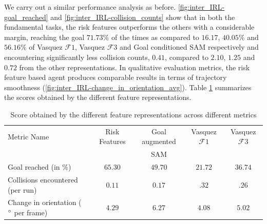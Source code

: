 
We carry out a similar performance analysis as before. \autoref{fig:inter_IRL-goal_reached} and \autoref{fig:inter_IRL-collision_counts} show that in both the fundamental tasks, the risk features outperforms the others with a considerable margin, reaching the goal $71.73\%$ of the times as compared to $16.17$, $40.05\%$ and $56.16\%$ of Vasquez $\mathcal{F}1$, Vasquez $\mathcal{F}3$ and Goal conditioned SAM respectively and encountering significantly less collision counts, $0.41$, compared to $2.10$, $1.25$ and $0.72$ from the other  representations. In qualitative evaluation metrics, the risk feature based agent produces comparable results in terms of trajectory smoothness (\autoref{fig:inter_IRL-change_in_orientation_avg}). %
Table \ref{tab:inter_irl_numerical_comparison} summarizes the scores obtained by the different feature representations.
\begin{table}[htbp]
	\begin{center}
		\renewcommand{\arraystretch}{1.5}
		\begin{tabular}{|p{2.5cm}|c|c|c|c|}
			\hline
			Metric Name & Risk Features & Goal augmented  & Vasquez $\mathcal{F}1$ & Vasquez $\mathcal{F}3$\\
			  &   & SAM  &  &  \\
			\hline
			Goal reached (in $\%$) & $65.30$ & $49.70$ & $21.72$ & $36.74$ \\
			Collisions encountered (per run) & $0.11$ & $0.17$ & $.32$ & $.26$\\
			Change in orientation ( $\degree$ per frame) & $4.29$ & $6.27$ &  $4.08$ & $ 5.02$\\
			\hline
		\end{tabular}
	\end{center}
	\caption{Score obtained by the different feature representations across different metrics}
	\label{tab:inter_irl_numerical_comparison}
\end{table}\\

